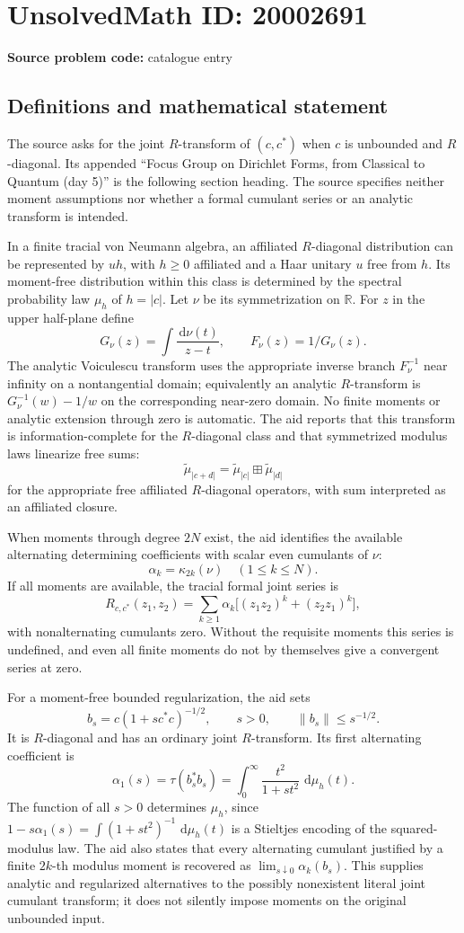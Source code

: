 \documentclass[11pt]{article}
\newcommand{\R}{\mathbb{R}}
\newcommand{\dd}{\,\mathrm{d}}
\begin{document}
\section*{UnsolvedMath ID: 20002691}
\textbf{Source problem code:} catalogue entry
\subsection{Definitions and mathematical statement}
The source asks for the joint $R$-transform of $(c,c^*)$ when $c$ is unbounded and $R$-diagonal. Its appended ``Focus Group on Dirichlet Forms, from Classical to Quantum (day 5)'' is the following section heading. The source specifies neither moment assumptions nor whether a formal cumulant series or an analytic transform is intended.

In a finite tracial von Neumann algebra, an affiliated $R$-diagonal distribution can be represented by $uh$, with $h\ge0$ affiliated and a Haar unitary $u$ free from $h$. Its moment-free distribution within this class is determined by the spectral probability law $\mu_h$ of $h=|c|$. Let $\nu$ be its symmetrization on $\R$. For $z$ in the upper half-plane define
\[
 G_\nu(z)=\int\frac{\dd\nu(t)}{z-t},\qquad F_\nu(z)=1/G_\nu(z).
\]
The analytic Voiculescu transform uses the appropriate inverse branch $F_\nu^{-1}$ near infinity on a nontangential domain; equivalently an analytic $R$-transform is $G_\nu^{-1}(w)-1/w$ on the corresponding near-zero domain. No finite moments or analytic extension through zero is automatic. The aid reports that this transform is information-complete for the $R$-diagonal class and that symmetrized modulus laws linearize free sums:
\[
 \widetilde\mu_{|c+d|}=\widetilde\mu_{|c|}\boxplus\widetilde\mu_{|d|}
\]
for the appropriate free affiliated $R$-diagonal operators, with sum interpreted as an affiliated closure.

When moments through degree $2N$ exist, the aid identifies the available alternating determining coefficients with scalar even cumulants of $\nu$:
\[
 \alpha_k=\kappa_{2k}(\nu)\quad(1\le k\le N).
\]
If all moments are available, the tracial formal joint series is
\[
 R_{c,c^*}(z_1,z_2)=\sum_{k\ge1}\alpha_k
 \bigl[(z_1z_2)^k+(z_2z_1)^k\bigr],
\]
with nonalternating cumulants zero. Without the requisite moments this series is undefined, and even all finite moments do not by themselves give a convergent series at zero.

For a moment-free bounded regularization, the aid sets
\[
 b_s=c(1+s c^*c)^{-1/2},\qquad s>0,\qquad \|b_s\|\le s^{-1/2}.
\]
It is $R$-diagonal and has an ordinary joint $R$-transform. Its first alternating coefficient is
\[
 \alpha_1(s)=\tau(b_s^*b_s)=\int_0^\infty\frac{t^2}{1+st^2}\,\dd\mu_h(t).
\]
The function of all $s>0$ determines $\mu_h$, since $1-s\alpha_1(s)=\int(1+st^2)^{-1}\,\dd\mu_h(t)$ is a Stieltjes encoding of the squared-modulus law. The aid also states that every alternating cumulant justified by a finite $2k$-th modulus moment is recovered as $\lim_{s\downarrow0}\alpha_k(b_s)$. This supplies analytic and regularized alternatives to the possibly nonexistent literal joint cumulant transform; it does not silently impose moments on the original unbounded input.
\end{document}
